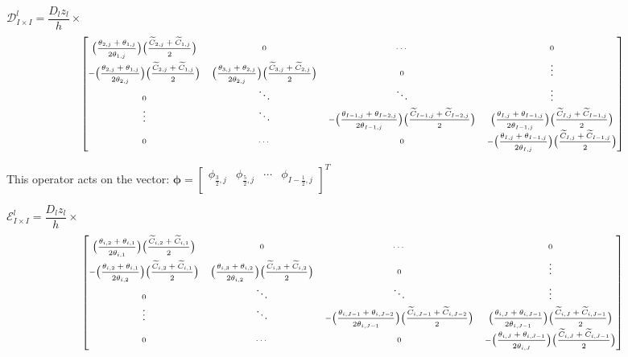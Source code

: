 \documentclass[11pt,a4paper]{article}
\begin{document}
\begin{flushleft}
\bigskip

\bigskip
$\mathcal{D}^l_{I \times I}=\dfrac{D_l z_l}{h} \times$
\begin{equation}
\label{eq:oper2}
{\fontsize{0.22cm}{0.20em} {\begin{bmatrix}
\Big(\dfrac{\theta_{2,j}+\theta_{1,j}}{2\theta_{1,j}}\Big) \Big(\dfrac{ \widetilde C_{2,j}+\widetilde C_{1,j}}{2}\Big)  &  0 & \cdots & 0\\
-\Big(\dfrac{\theta_{2,j}+\theta_{1,j}}{2\theta_{2,j}}\Big) \Big(\dfrac{ \widetilde C_{2,j}+\widetilde C_{1,j}}{2}\Big)   & \Big(\dfrac{\theta_{3,j}+\theta_{2,j}}{2\theta_{2,j}}\Big) \Big(\dfrac{ \widetilde C_{3,j}+\widetilde C_{2,j}}{2}\Big)   & 0  & \vdots \\
0 & \ddots & \ddots & \vdots \\
\vdots & \ddots & -\Big(\dfrac{\theta_{I-1,j}+\theta_{I-2,j}}{2\theta_{I-1,j}}\Big) \Big(\dfrac{ \widetilde C_{I-1,j}+\widetilde C_{I-2,j}}{2}\Big)  & \Big(\dfrac{\theta_{I,j}+\theta_{I-1,j}}{2\theta_{I-1,j}}\Big) \Big(\dfrac{ \widetilde C_{I,j}+\widetilde C_{I-1,j}}{2}\Big)  \\
0 & \cdots & 0 & -\Big(\dfrac{\theta_{I,j}+\theta_{I-1,j}}{2\theta_{I,j}}\Big) \Big(\dfrac{ \widetilde C_{I,j}+\widetilde C_{I-1,j}}{2}\Big) \\
\end{bmatrix}}}
\end{equation}

This operator acts on the vector: $ \mathbf{\phi}= \begin{bmatrix} \phi_{\frac{3}{2},j} & \phi_{\frac{5}{2},j} & \cdots & \phi_{I-\frac{1}{2},j}\\ \end{bmatrix}^T$ 

\bigskip

\bigskip
$\mathcal{E}^l_{I \times I}=\dfrac{D_l z_l}{h} \times$
\begin{equation}
\label{eq:oper3}
{\fontsize{0.22cm}{0.20em} {\begin{bmatrix}
\Big(\dfrac{\theta_{i,2}+\theta_{i,1}}{2\theta_{i,1}}\Big) \Big(\dfrac{ \widetilde C_{i,2}+\widetilde C_{i,1}}{2}\Big)  &  0 & \cdots & 0\\
-\Big(\dfrac{\theta_{i,2}+\theta_{i,1}}{2\theta_{i,2}}\Big) \Big(\dfrac{ \widetilde C_{i,2}+\widetilde C_{i,1}}{2}\Big)   & \Big(\dfrac{\theta_{i,3}+\theta_{i,2}}{2\theta_{i,2}}\Big) \Big(\dfrac{ \widetilde C_{i,3}+\widetilde C_{i,2}}{2}\Big)   & 0  & \vdots \\
0 & \ddots & \ddots & \vdots \\
\vdots & \ddots & -\Big(\dfrac{\theta_{i,J-1}+\theta_{i,J-2}}{2\theta_{i,J-1}}\Big) \Big(\dfrac{ \widetilde C_{i,J-1}+\widetilde C_{i,J-2}}{2}\Big)  & \Big(\dfrac{\theta_{i,J}+\theta_{i,J-1}}{2\theta_{i,J-1}}\Big) \Big(\dfrac{ \widetilde C_{i,J}+\widetilde C_{i,J-1}}{2}\Big)  \\
0 & \cdots & 0 & -\Big(\dfrac{\theta_{i,J}+\theta_{i,J-1}}{2\theta_{i,J}}\Big) \Big(\dfrac{ \widetilde C_{i,J}+\widetilde C_{i,J-1}}{2}\Big) \\
\end{bmatrix}}}
\end{equation}


\end{flushleft}
\end{document}

